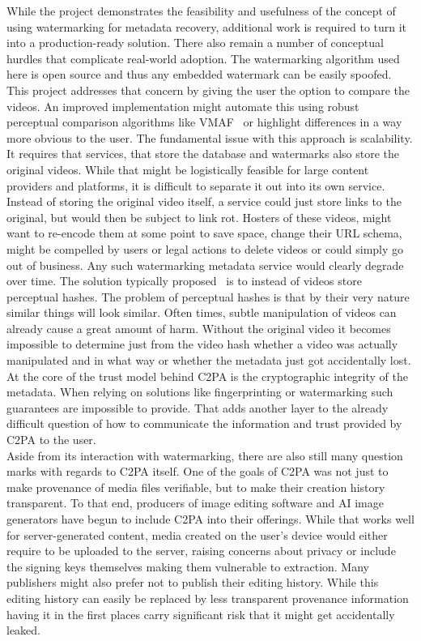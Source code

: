 \documentclass[12pt, technote]{IEEEtran}
\begin{document}
While the project demonstrates the feasibility and usefulness of the concept of using watermarking for metadata recovery, additional work is required to turn it into a production-ready solution. There also remain a number of conceptual hurdles that complicate real-world adoption. The watermarking algorithm used here is open source and thus any embedded watermark can be easily spoofed. This project addresses that concern by giving the user the option to compare the videos. An improved implementation might automate this using robust perceptual comparison algorithms like VMAF~\cite{topiwala2021vmafvariantsunifiedvqa} or highlight differences in a way more obvious to the user. The fundamental issue with this approach is scalability. It requires that services, that store the database and watermarks also store the original videos. While that might be logistically feasible for large content providers and platforms, it is difficult to separate it out into its own service. Instead of storing the original video itself, a service could just store links to the original, but would then be subject to link rot. Hosters of these videos, might want to re-encode them at some point to save space, change their URL schema, might be compelled by users or legal actions to delete videos or could simply go out of business. Any such watermarking metadata service would clearly degrade over time. 
The solution typically proposed~\cite{durablecontent} is to instead of videos store perceptual hashes. The problem of perceptual hashes is that by their very nature similar things will look similar. Often times, subtle manipulation of videos can already cause a great amount of harm. Without the original video it becomes impossible to determine just from the video hash whether a video was actually manipulated and in what way or whether the metadata just got accidentally lost. At the core of the trust model behind C2PA is the cryptographic integrity of the metadata. When relying on solutions like fingerprinting or watermarking such guarantees are impossible to provide.
That adds another layer to the already difficult question of how to communicate the information and trust provided by C2PA to the user.\\
Aside from its interaction with watermarking, there are also still many question marks with regards to C2PA itself. One of the goals of C2PA was not just to make provenance of media files verifiable, but to make their creation history transparent. To that end, producers of image editing software\cite{adobe} and AI image generators\cite{openai} have begun to include C2PA into their offerings. While that works well for server-generated content, media created on the user's device would either require to be uploaded to the server, raising concerns about privacy or include the signing keys themselves making them vulnerable to extraction.
Many publishers might also prefer not to publish their editing history. While this editing history can easily be replaced by less transparent provenance information having it in the first places carry significant risk that it might get accidentally leaked.
\end{document}
